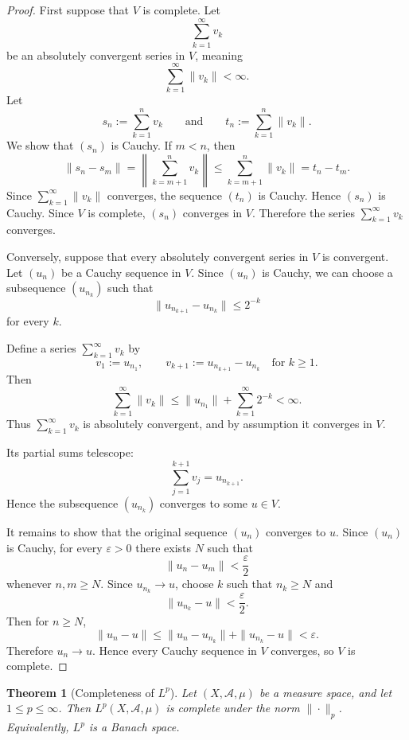 \documentclass[12pt]{article}
\newtheorem{theorem}{Theorem}
\begin{document}
\begin{proof}
First suppose that \(V\) is complete. Let
\[
\sum_{k=1}^{\infty} v_k
\]
be an absolutely convergent series in \(V\), meaning
\[
\sum_{k=1}^{\infty} \|v_k\|<\infty.
\]
Let
\[
s_n:=\sum_{k=1}^{n}v_k
\qquad\text{and}\qquad
t_n:=\sum_{k=1}^{n}\|v_k\|.
\]
We show that \((s_n)\) is Cauchy. If \(m<n\), then
\[
\|s_n-s_m\|
=
\left\|\sum_{k=m+1}^{n}v_k\right\|
\leq
\sum_{k=m+1}^{n}\|v_k\|
=
t_n-t_m.
\]
Since \(\sum_{k=1}^{\infty}\|v_k\|\) converges, the sequence \((t_n)\) is
Cauchy. Hence \((s_n)\) is Cauchy. Since \(V\) is complete, \((s_n)\)
converges in \(V\). Therefore the series \(\sum_{k=1}^{\infty}v_k\)
converges.

Conversely, suppose that every absolutely convergent series in \(V\) is
convergent. Let \((u_n)\) be a Cauchy sequence in \(V\). Since \((u_n)\) is
Cauchy, we can choose a subsequence \((u_{n_k})\) such that
\[
\|u_{n_{k+1}}-u_{n_k}\|\leq 2^{-k}
\]
for every \(k\).

Define a series \(\sum_{k=1}^{\infty}v_k\) by
\[
v_1:=u_{n_1},
\qquad
v_{k+1}:=u_{n_{k+1}}-u_{n_k}
\quad \text{for } k\geq 1.
\]
Then
\[
\sum_{k=1}^{\infty}\|v_k\|
\leq
\|u_{n_1}\|+\sum_{k=1}^{\infty}2^{-k}
<\infty.
\]
Thus \(\sum_{k=1}^{\infty}v_k\) is absolutely convergent, and by assumption it
converges in \(V\).

Its partial sums telescope:
\[
\sum_{j=1}^{k+1}v_j
=
u_{n_{k+1}}.
\]
Hence the subsequence \((u_{n_k})\) converges to some \(u\in V\).

It remains to show that the original sequence \((u_n)\) converges to \(u\).
Since \((u_n)\) is Cauchy, for every \(\varepsilon>0\) there exists \(N\) such
that
\[
\|u_n-u_m\|<\frac{\varepsilon}{2}
\]
whenever \(n,m\geq N\). Since \(u_{n_k}\to u\), choose \(k\) such that
\(n_k\geq N\) and
\[
\|u_{n_k}-u\|<\frac{\varepsilon}{2}.
\]
Then for \(n\geq N\),
\[
\|u_n-u\|
\leq
\|u_n-u_{n_k}\|+\|u_{n_k}-u\|
<
\varepsilon.
\]
Therefore \(u_n\to u\). Hence every Cauchy sequence in \(V\) converges, so
\(V\) is complete.
\end{proof}

\begin{theorem}[Completeness of $L^p$]
Let $(X,\mathcal{A},\mu)$ be a measure space, and let $1\le p\le \infty$.
Then $L^p(X,\mathcal{A},\mu)$ is complete under the norm $\|\cdot\|_p$.
Equivalently, $L^p$ is a Banach space.
\end{theorem}
\end{document}
